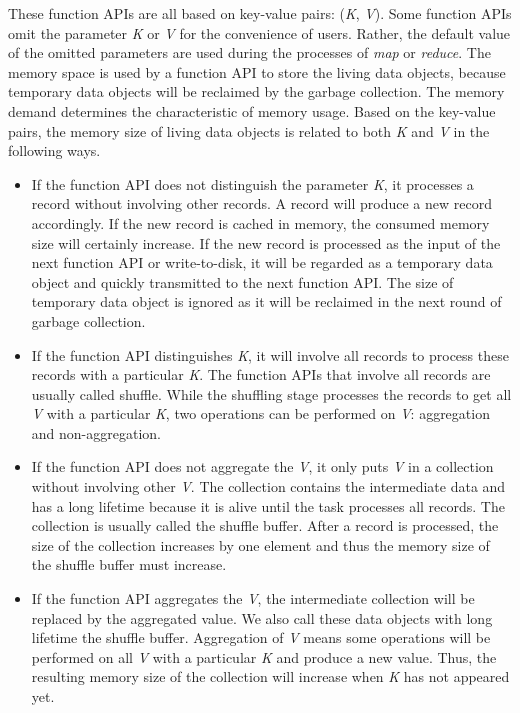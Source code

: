 These function APIs are all based on key-value pairs: (\textit{K}, \textit{V}). Some function APIs omit the parameter \textit{K} or \textit{V} for the convenience of users. Rather, the default value of the omitted parameters are used during the processes of \textit{map} or \textit{reduce}. The memory space is used by a function API to store the living data objects, because temporary data objects will be reclaimed by the garbage collection. The memory demand determines the characteristic of memory usage. Based on the key-value pairs, the memory size of living data objects is related to both \textit{K} and \textit{V} in the following ways.

\begin{itemize}

\item If the function API does not distinguish the parameter \textit{K}, it processes a record without involving other records. A record will produce a new record accordingly. If the new record is cached in memory, the consumed memory size will certainly increase. If the new record is processed as the input of the next function API or write-to-disk, it will be regarded as a temporary data object and quickly transmitted to the next function API. The size of temporary data object is ignored as it will be reclaimed in the next round of garbage collection.

\item If the function API distinguishes \textit{K}, it will involve all records to process these records with a particular \textit{K}. The function APIs that involve all records are usually called shuffle. While the shuffling stage processes the records to get all \textit{V} with a particular \textit{K}, two operations can be performed on \textit{V}: aggregation and non-aggregation.

\item If the function API does not aggregate the \textit{V}, it only puts \textit{V} in a collection without involving other \textit{V}. The collection contains the intermediate data and has a long lifetime because it is alive until the task processes all records. The collection is usually called the shuffle buffer. After a record is processed, the size of the collection increases by one element and thus the memory size of the shuffle buffer must increase.

\item If the function API aggregates the \textit{V}, the intermediate collection will be replaced by the aggregated value. We also call these data objects with long lifetime the shuffle buffer. Aggregation of \textit{V} means some operations will be performed on all \textit{V} with a particular \textit{K} and produce a new value. Thus, the resulting memory size of the collection will increase when \textit{K} has not appeared yet.

\end{itemize}

